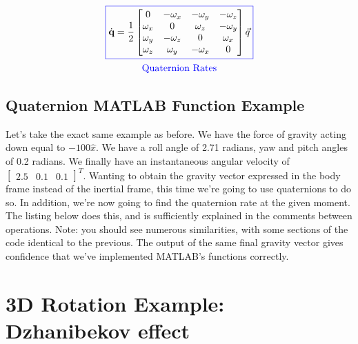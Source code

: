 \documentclass[12pt]{report}
\begin{document}
\begin{gather}\label{eq: quat rates}
    \color{blue}\boxed{\color{black}\dot{\textbf{q}}=\frac{1}{2}\begin{bmatrix}
        0&-\omega_x&-\omega_y&-\omega_z\\
        \omega_x&0&\omega_z&-\omega_y\\
        \omega_y&-\omega_z&0&\omega_x\\
        \omega_z&\omega_y&-\omega_x&0
    \end{bmatrix}\vec{q}}
    \\\mathrm{\color{blue}Quaternion \ Rates}
\end{gather}

\subsection{Quaternion MATLAB Function Example}

Let's take the exact same example as before. We have the force of gravity acting down equal to $-100\hat{x}$. We have a roll angle of 2.71 radians, yaw and pitch angles of 0.2 radians. We finally have an instantaneous angular velocity of $\begin{bmatrix}
    2.5&0.1&0.1
\end{bmatrix}^T$. Wanting to obtain the gravity vector expressed in the body frame instead of the inertial frame, this time we're going to use quaternions to do so. In addition, we're now going to find the quaternion rate at the given moment. The listing below does this, and is sufficiently explained in the comments between operations. Note: you should see numerous similarities, with some sections of the code identical to the previous. The output of the same final gravity vector gives confidence that we've implemented MATLAB's functions correctly.

\lstset{style=mystyle}

\label{Quat Dynamics Listing}


\section{3D Rotation Example: Dzhanibekov effect}\label{sec:Dzhan}
\end{document}
